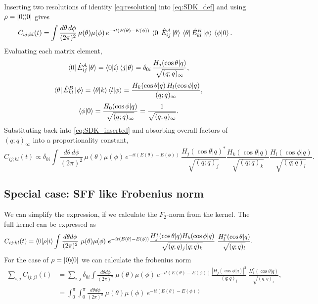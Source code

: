 \documentclass[12pt]{scrarticle}
\begin{document}
Inserting two resolutions of identity \eqref{eq:resolution} into \eqref{eq:SDK_def}
and using $\rho = \ketbra{0}{0}$ gives
\begin{align}
    C_{ij;kl}(t)
    &= \int\frac{d\theta\,d\phi}{(2\pi)^2}\,\mu(\theta)\mu(\phi)\,
       e^{-it(E(\theta)-E(\phi))}\,
       \bra{0}\hat{E}^A_{ij}\ket{\theta}\,
       \bra{\theta}\hat{E}^B_{kl}\ket{\phi}\,
       \braket{\phi|0}.
    \label{eq:SDK_inserted}
\end{align}
Evaluating each matrix element,
\begin{equation}
    \bra{0}\hat{E}^A_{ij}\ket{\theta}
    = \braket{0|i}\braket{j|\theta}
    = \delta_{0i}\,\frac{H_j(\cos\theta| q)}{\sqrt{(q;q)_\infty}},
\end{equation}
\begin{equation}
    \bra{\theta}\hat{E}^B_{kl}\ket{\phi}
    = \braket{\theta|k}\braket{l|\phi}
    = \frac{H_k(\cos\theta| q)\,H_l(\cos\phi| q)}{(q;q)_\infty},
\end{equation}
\begin{equation}
    \braket{\phi|0} = \frac{H_0(\cos\phi| q)}{\sqrt{(q;q)_\infty}} = \frac{1}{\sqrt{(q;q)_\infty}}.
\end{equation}
Substituting back into \eqref{eq:SDK_inserted} and absorbing overall factors of $(q;q)_\infty$
into a proportionality constant,
\begin{equation}
    \boxed{
    C_{ij;kl}(t) \propto \delta_{0i}
    \int\frac{d\theta\,d\phi}{(2\pi)^2}\,\mu(\theta)\mu(\phi)\,
    e^{-it(E(\theta)-E(\phi))}\,
    \frac{H_j(\cos\theta| q)^*}{\sqrt{(q;q)_j}}
    \frac{H_k(\cos\theta| q)}{\sqrt{(q;q)_k}}
    \frac{H_l(\cos\phi| q)}{\sqrt{(q;q)_l}}.
    }
    \label{eq:SDK_result}
\end{equation}

\subsection{Special case: SFF like Frobenius norm}
We can simplify the expression, if we calculate the $F_2$-norm from the kernel. The full kernel can be expressed as
\begin{align}
    C_{ij;kl}(t) = 
    \braket{0|\rho|i} \int \frac{d\theta d\phi}{(2\pi)^2} \ \mu(\theta) \mu(\phi) \
    e^{-i t(E(\theta)-E(\phi))} 
    \frac{H_j^*(\cos \theta |q) H_k(\cos \phi|q)}{\sqrt{(q;q)_j (q;q)_k}} \ 
    \frac{H_l^*(\cos\theta |q)}{\sqrt{(q;q)_l}}.
\end{align}
For the case of $\rho = \ketbra{0}{0}$ we can calculate the frobenius norm
\begin{align}
    \sum_{i,j} C_{ij;ji}(t) &= \sum_{i,j} \delta_{0i} \int \frac{d\theta d\phi}{(2\pi)^2} \ \mu(\theta) \mu(\phi) \
    e^{-i t(E(\theta)-E(\phi))} 
    \frac{\left| H_j(\cos{\phi}|q) \right|^2}{(q;q)_j} \ 
    \frac{H_i^*(\cos\theta |q)}{\sqrt{(q;q)_i}},
\\
    &= \int^\pi_0 \int^\pi_0 \frac{d\theta d\phi}{(2\pi)^2} \ \mu(\theta) \mu(\phi) \
    e^{-i t(E(\theta)-E(\phi))} 
    \label{eq:cijji}
\end{align}
\end{document}
